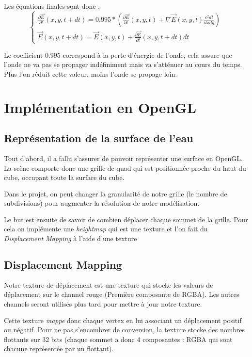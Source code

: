 \documentclass[a4paper,11pt,leqno]{article}
\begin{document}
Les équations finales sont donc :
\[
\begin{cases}
	\frac{\partial \overrightarrow{E}}{\partial t}(x, y, t+dt) = 0.995 * (\frac{\partial \overrightarrow{E}}{\partial t}(x, y, t) + \nabla \overrightarrow{E}(x, y, t) \frac{c^2dt}{dx dy}) \\
	
	\overrightarrow{E}(x,y,t+dt) = \overrightarrow{E}(x,y,t) + \frac{\partial \overrightarrow{E}}{\partial t}(x, y, t+dt)dt
\end{cases}
\]

Le coefficient $0.995$ correspond à la perte d'énergie de l'onde, cela assure que l'onde ne va pas se propager indéfiniment mais va s'atténuer au cours du temps. Plus l'on réduit cette valeur, moins l'onde se propage loin.

\section{Implémentation en OpenGL}

\subsection{Représentation de la surface de l'eau}

Tout d'abord, il a fallu s'assurer de pouvoir représenter une surface en OpenGL. La scène comporte donc une grille de quad qui est positionnée proche du haut du cube, occupant toute la surface du cube.

Dans le projet, on peut changer la granularité de notre grille (le nombre de subdivisions) pour augmenter la résolution de notre modélisation.

Le but est ensuite de savoir de combien déplacer chaque sommet de la grille. Pour cela on implémente une \emph{heightmap} qui est une texture et l'on fait du \emph{Displacement Mapping} à l'aide d'une texture

\subsection{Displacement Mapping}

Notre texture de déplacement est une texture qui stocke les valeurs de déplacement sur le channel rouge (Première composante de RGBA). Les autres channels seront utilisés plus tard pour mettre à jour notre texture.

Cette texture \emph{mappe} donc chaque vertex en lui associant un déplacement positif ou négatif. Pour ne pas s'encombrer de conversion, la texture stocke des nombres flottants sur 32 bits (chaque sommet a donc 4 composantes : RGBA qui sont chacune représentée par un flottant).
\end{document}
